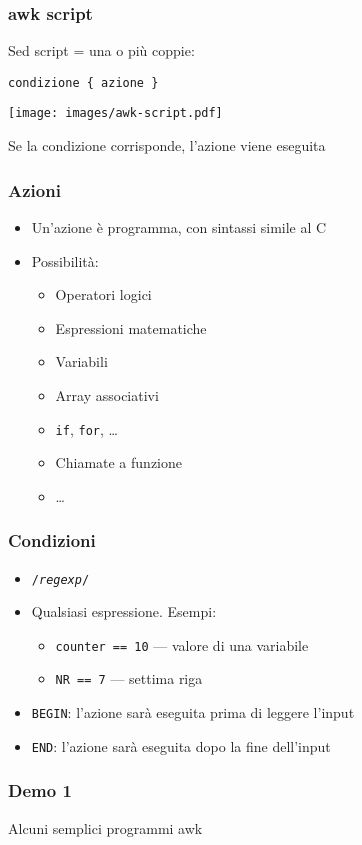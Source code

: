 \documentclass[xetex,table]{beamer}
\begin{document}
\begin{frame}[fragile]
  \frametitle{awk script}
  Sed script = una o più coppie:
  \begin{verbatim}
condizione { azione }
  \end{verbatim}
    \begin{center}
      \texttt{[image: images/awk-script.pdf]}
    \end{center}
    Se la condizione corrisponde, l'azione viene eseguita
\end{frame}

\begin{frame}
  \frametitle{Azioni}
  \begin{itemize}
  \item Un'azione è programma, con sintassi simile al C
  \item Possibilità:
    \begin{itemize}
    \item Operatori logici
    \item Espressioni matematiche
    \item Variabili
    \item Array associativi
    \item \texttt{if}, \texttt{for}, \dots
    \item Chiamate a funzione
    \item\dots
    \end{itemize}
  \end{itemize}
\end{frame}

\begin{frame}
  \frametitle{Condizioni}
  \begin{itemize}
  \item \texttt{/{\em regexp}/}
  \item Qualsiasi espressione. Esempi:
    \begin{itemize}
    \item \texttt{counter == 10} --- valore di una variabile
    \item \texttt{NR == 7} --- settima riga
    \end{itemize}
  \item \texttt{BEGIN}: l'azione sarà eseguita prima di leggere l'input
  \item \texttt{END}: l'azione sarà eseguita dopo la fine dell'input
  \end{itemize}
\end{frame}

\begin{frame}
  \frametitle{Demo 1}
  \begin{center}
    Alcuni semplici programmi awk
  \end{center}
\end{frame}
\end{document}
